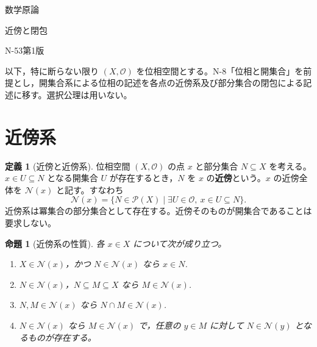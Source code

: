 \documentclass[a5paper,10pt,dvipdfmx]{jsarticle}
\theoremstyle{definition}
\newtheorem{defn}[ruledef]{定義}
\theoremstyle{plain}
\newtheorem{prop}[ruledef]{命題}
\newcommand{\Pow}{\mathcal{P}}
\begin{document}
\begin{center}
{\small 数学原論}\par\vspace{4mm}
{\LARGE 近傍と閉包}\par\vspace{2mm}
{\small N-53\quad 第1版}
\end{center}
以下，特に断らない限り $(X,\mathcal O)$ を位相空間とする。N-8「位相と開集合」を前提とし，開集合系による位相の記述を各点の近傍系及び部分集合の閉包による記述に移す。選択公理は用いない。
\section{近傍系}
\begin{defn}[近傍と近傍系]\label{k194}
位相空間 $(X,\mathcal O)$ の点 $x$ と部分集合 $N\subseteq X$ を考える。$x\in U\subseteq N$ となる開集合 $U$ が存在するとき，$N$ を $x$ の\textbf{近傍}という。$x$ の近傍全体を $\mathcal N(x)$ と記す。すなわち
\[
 \mathcal N(x)=\{N\in\Pow(X)\mid
 \exists U\in\mathcal O,\ x\in U\subseteq N\}.
\]
近傍系は冪集合の部分集合として存在する。近傍そのものが開集合であることは要求しない。
\end{defn}
\begin{prop}[近傍系の性質]\label{k195}
各 $x\in X$ について次が成り立つ。
\begin{enumerate}
\item $X\in\mathcal N(x)$，かつ $N\in\mathcal N(x)$ なら $x\in N$.
\item $N\in\mathcal N(x)$，$N\subseteq M\subseteq X$ なら $M\in\mathcal N(x)$.
\item $N,M\in\mathcal N(x)$ なら $N\cap M\in\mathcal N(x)$.
\item $N\in\mathcal N(x)$ なら $M\in\mathcal N(x)$ で，任意の $y\in M$ に対して $N\in\mathcal N(y)$ となるものが存在する。
\end{enumerate}
\end{prop}
\end{document}
